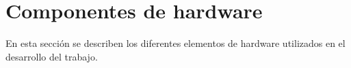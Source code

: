


\section{Componentes de hardware}\label{sec:hardware}

En esta sección se describen los diferentes elementos de hardware utilizados en
el desarrollo del trabajo. %


